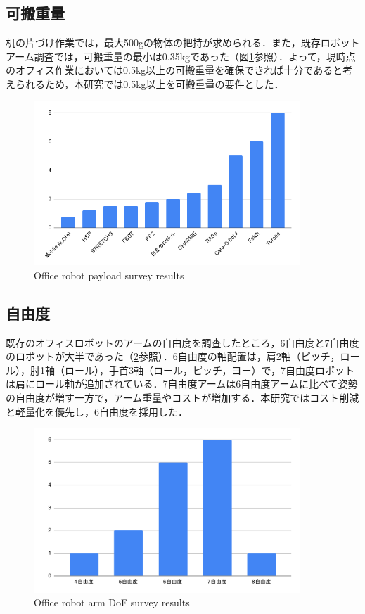 \subsection{可搬重量}
机の片づけ作業では，最大500gの物体の把持が求められる．また，既存ロボットアーム調査では，可搬重量の最小は0.35kgであった（図\ref{fig:payload}参照）．よって，現時点のオフィス作業においては0.5kg以上の可搬重量を確保できれば十分であると考えられるため，本研究では0.5kg以上を可搬重量の要件とした．
\begin{figure}
  \centering
  \includegraphics[width=10cm]{images/2syou/payload.png}
  \caption{Office robot payload survey results}
  \label{fig:payload}
\end{figure}
\clearpage

\subsection{自由度}
既存のオフィスロボットのアームの自由度を調査したところ，6自由度と7自由度のロボットが大半であった（\ref{fig:armDof}参照）．6自由度の軸配置は，肩2軸（ピッチ，ロール），肘1軸（ロール），手首3軸（ロール，ピッチ，ヨー）で，7自由度ロボットは肩にロール軸が追加されている．7自由度アームは6自由度アームに比べて姿勢の自由度が増す一方で，アーム重量やコストが増加する．本研究ではコスト削減と軽量化を優先し，6自由度を採用した．
\begin{figure}[h]
  \centering
  \includegraphics[width=10cm]{images/2syou/armDof.pdf}
  \caption{Office robot arm DoF survey results}
  \label{fig:armDof}
\end{figure}
\clearpage

